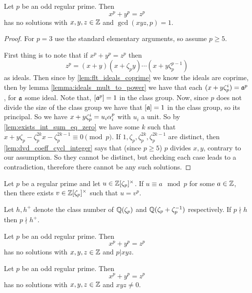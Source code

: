 \begin{theorem}\label{theorem:FLT_case_one}
    \leanok
	Let $p$ be an odd regular prime. Then \[x^p+y^p=z^p\] has no solutions with $x,y,z \in \mathbb{Z}$ and $\gcd(xyz,p)=1$.
\end{theorem}
\begin{proof}
	For $p=3$ use the standard elementary arguments, so assume $p \geq 5$.

	First thing is to note that if $x^p+y^p=z^p$ then \[z^p=(x+y)(x+\zeta_py)\cdots(x+y\zeta_p^{p-1})\] as ideals. Then since by \ref{lem:flt_ideals_coprime} we know the ideals are coprime, then by lemma \ref{lemma:ideals_mult_to_power} we have that each $(x+y\zeta_p^i)=\mathfrak{a}^p$, for $\mathfrak{a}$ some ideal. Note that, $[\mathfrak{a}^p]=1$ in the class group. Now, since $p$ does not divide the size of the class group we have that $[\mathfrak{a}]=1$ in the class group, so its principal. So we have $x+y\zeta_p^i=u_i\alpha_i^p$ with $u_i$ a unit. So by \ref{lem:exists_int_sum_eq_zero} we have some $k$ such that $x+y\zeta_p-\zeta_p^{2k}x-\zeta_p^{2k-1} \equiv 0 \pmod p$. If $1,\zeta_p,\zeta_p^{2k},\zeta_p^{2k-1}$ are distinct, then \ref{lem:dvd_coeff_cycl_integer} says that (since $p \geq 5$) $p$  divides $x,y$, contrary to our assumption. So they cannot be distinct, but checking each case leads to a contradiction, therefore there cannot be any such solutions.
\end{proof}

\begin{theorem}\label{thm:Kummers_lemma}
	\leanok
	Let $p$ be a regular prime and let $u \in \mathbb{Z}[\zeta_p]^\times$. If $u \equiv a \mod p$ for some $a \in \mathbb{Z}$, then there exists $v \in \mathbb{Z}[\zeta_p]^\times$ such that $u=v^p$.
\end{theorem}

\begin{theorem}
	Let $h,h^+$ denote the class number of $\mathbb{Q}(\zeta_p)$ and $\mathbb{Q}(\zeta_p+\zeta_p^{-1})$ respectively. If $p \nmid h$ then $p \nmid h^+$.
\end{theorem}

\begin{theorem}\label{theorem:FLT_case_two}
	\leanok
	Let $p$ be an odd regular prime. Then \[x^p+y^p=z^p\] has no solutions with $x,y,z \in \mathbb{Z}$ and $p | xyz$.
\end{theorem}


\begin{theorem}\label{FLT_regular}
	\leanok
	Let $p$ be an odd regular prime.  Then \[x^p+y^p=z^p\] has no solutions with $x,y,z \in \mathbb{Z}$ and $xyz \ne 0$.
\end{theorem}
